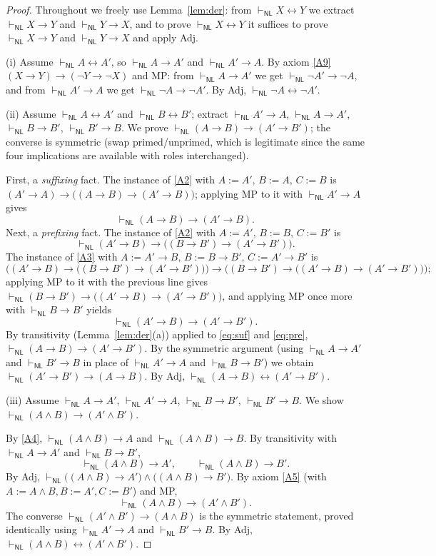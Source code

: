 \documentclass[12pt]{article}
\theoremstyle{definition}
\newcommand{\NL}{\mathsf{NL}}
\newcommand{\prv}{\vdash_{\NL}}
\newcommand{\imp}{\rightarrow}
\newcommand{\bic}{\leftrightarrow}
\begin{document}
\begin{proof}
Throughout we freely use Lemma~\ref{lem:der}: from $\prv X\bic Y$ we extract
$\prv X\imp Y$ and $\prv Y\imp X$, and to prove $\prv X\bic Y$ it suffices to
prove $\prv X\imp Y$ and $\prv Y\imp X$ and apply Adj.

\smallskip
\noindent(i) Assume $\prv A\bic A'$, so $\prv A\imp A'$ and $\prv A'\imp A$.
By axiom \eqref{A9} $(X\imp Y)\imp(\neg Y\imp\neg X)$ and MP:
from $\prv A\imp A'$ we get $\prv \neg A'\imp\neg A$, and from $\prv A'\imp A$
we get $\prv \neg A\imp\neg A'$. By Adj, $\prv\neg A\bic\neg A'$.

\smallskip
\noindent(ii) Assume $\prv A\bic A'$ and $\prv B\bic B'$; extract
$\prv A'\imp A$, $\prv A\imp A'$, $\prv B\imp B'$, $\prv B'\imp B$.
We prove $\prv (A\imp B)\imp(A'\imp B')$; the converse is symmetric (swap
primed/unprimed, which is legitimate since the same four implications are
available with roles interchanged).

First, a \emph{suffixing} fact. The instance of \eqref{A2} with
$A:=A',\,B:=A,\,C:=B$ is
$(A'\imp A)\imp\big((A\imp B)\imp(A'\imp B)\big)$; applying MP to it with
$\prv A'\imp A$ gives
\begin{equation}\label{eq:suf}
\prv (A\imp B)\imp(A'\imp B).
\end{equation}
Next, a \emph{prefixing} fact. The instance of \eqref{A2} with
$A:=A',\,B:=B,\,C:=B'$ is
\[
\prv (A'\imp B)\imp\big((B\imp B')\imp(A'\imp B')\big).
\]
The instance of \eqref{A3} with $A:=A'\imp B,\,B:=B\imp B',\,C:=A'\imp B'$ is
\[
\Big((A'\imp B)\imp\big((B\imp B')\imp(A'\imp B')\big)\Big)\imp
\Big((B\imp B')\imp\big((A'\imp B)\imp(A'\imp B')\big)\Big);
\]
applying MP to it with the previous line gives
$\prv (B\imp B')\imp\big((A'\imp B)\imp(A'\imp B')\big)$, and applying MP
once more with $\prv B\imp B'$ yields
\begin{equation}\label{eq:pre}
\prv (A'\imp B)\imp(A'\imp B').
\end{equation}
By transitivity (Lemma~\ref{lem:der}(a)) applied to \eqref{eq:suf} and
\eqref{eq:pre}, $\prv (A\imp B)\imp(A'\imp B')$. By the symmetric argument
(using $\prv A\imp A'$ and $\prv B'\imp B$ in place of $\prv A'\imp A$ and
$\prv B\imp B'$) we obtain $\prv (A'\imp B')\imp(A\imp B)$. By Adj,
$\prv (A\imp B)\bic(A'\imp B')$.

\smallskip
\noindent(iii) Assume $\prv A\imp A'$, $\prv A'\imp A$, $\prv B\imp B'$,
$\prv B'\imp B$. We show $\prv (A\wedge B)\imp(A'\wedge B')$.

By \eqref{A4}, $\prv (A\wedge B)\imp A$ and $\prv (A\wedge B)\imp B$. By
transitivity with $\prv A\imp A'$ and $\prv B\imp B'$,
\[
\prv (A\wedge B)\imp A', \qquad \prv (A\wedge B)\imp B'.
\]
By Adj,
$\prv \big((A\wedge B)\imp A'\big)\wedge\big((A\wedge B)\imp B'\big)$.
By axiom \eqref{A5} (with $A:=A\wedge B,B:=A',C:=B'$) and MP,
\[
\prv (A\wedge B)\imp(A'\wedge B').
\]
The converse $\prv (A'\wedge B')\imp(A\wedge B)$ is the symmetric statement,
proved identically using $\prv A'\imp A$ and $\prv B'\imp B$. By Adj,
$\prv (A\wedge B)\bic(A'\wedge B')$.


\end{proof}
\end{document}
